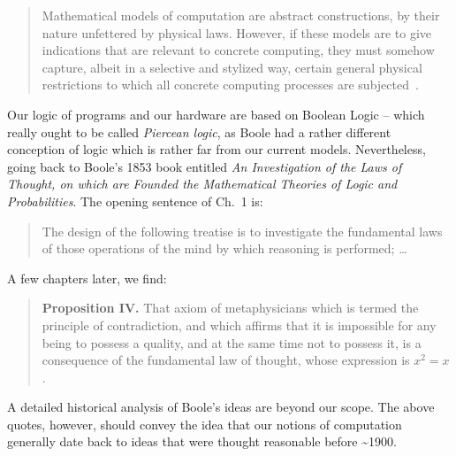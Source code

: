 \documentclass{article}
\begin{document}
{\begin{quote} Mathematical models of computation are abstract
  constructions, by their nature unfettered by physical laws. However,
  if these models are to give indications that are relevant to
  concrete computing, they must somehow capture, albeit in a selective
  and stylized way, certain general physical restrictions to which all
  concrete computing processes are subjected~\cite{toffoli:1980}.
\end{quote}}

Our logic of programs and our hardware are based on Boolean Logic
-- which really
ought to be called \emph{Piercean logic}, as Boole had a rather different
conception of logic which is rather far from our current models.
Nevertheless, going back
to Boole's 1853 book entitled \emph{An Investigation of the Laws of Thought,
  on which are Founded the Mathematical Theories of Logic and
  Probabilities}. The opening sentence of Ch.~1 is:
\begin{quote}
  The design of the following treatise is to investigate the fundamental laws
  of those operations of the mind by which reasoning is performed; \ldots
\end{quote}
A few chapters later, we find:
\begin{quote}
  \textbf{Proposition IV.}  That axiom of metaphysicians which is termed the
  principle of contradiction, and which affirms that it is impossible for any
  being to possess a quality, and at the same time not to possess it, is a
  consequence of the fundamental law of thought, whose expression is $x^2 =
  x$.
\end{quote}
A detailed historical analysis of Boole's ideas are beyond our scope.
The above quotes, however, should convey the idea that our notions of
computation generally date back to ideas that were thought reasonable
before \textasciitilde 1900.
\end{document}

